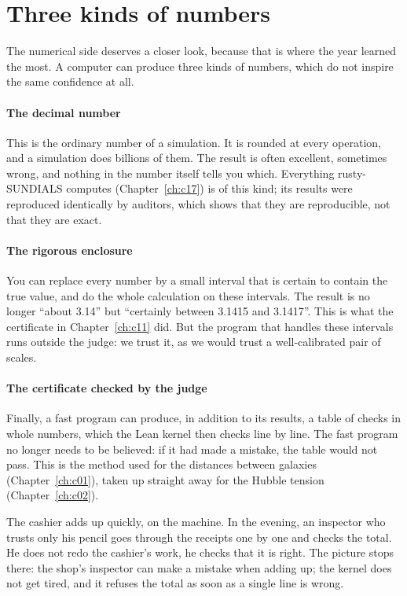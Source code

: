 \section{Three kinds of numbers}

The numerical side deserves a closer look, because that is where the year learned the most. A computer can produce
three kinds of numbers, which do not inspire the same confidence at all.

\paragraph{The decimal number } This is the ordinary number of a simulation. It is rounded at every
operation, and a simulation does billions of them. The result is often excellent, sometimes wrong, and nothing in the
number itself tells you which. Everything rusty-SUNDIALS computes (Chapter~\ref{ch:c17}) is of this kind; its results
were reproduced identically by auditors, which shows that they are reproducible, not that they are exact.

\paragraph{The rigorous enclosure} You can replace every number by a small interval that is certain to contain the
true value, and do the whole calculation on these intervals. The result is no longer ``about 3.14'' but ``certainly
between 3.1415 and 3.1417''. This is what the certificate in Chapter~\ref{ch:c11} did. But the program that handles
these intervals runs outside the judge: we trust it, as we would trust a well-calibrated pair of scales.

\paragraph{The certificate checked by the judge } Finally, a fast program can produce, in addition to its
results, a table of checks in whole numbers, which the Lean kernel then checks line by line. The fast program no
longer needs to be believed: if it had made a mistake, the table would not pass. This is the method used for the
distances between galaxies (Chapter~\ref{ch:c01}), taken up straight away for the Hubble tension
(Chapter~\ref{ch:c02}).

\begin{analogie}
The cashier adds up quickly, on the machine. In the evening, an inspector who trusts only his pencil goes through the
receipts one by one and checks the total. He does not redo the cashier's work, he checks that it is right. The
picture stops there: the shop's inspector can make a mistake when adding up; the kernel does not get tired, and it
refuses the total as soon as a single line is wrong.
\end{analogie}

